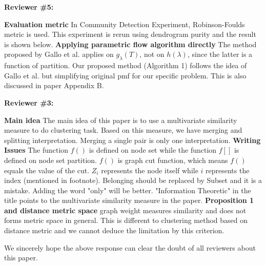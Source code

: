 \documentclass{article}
\begin{document}
\textbf{Reviewer \#5:}

\textbf{Evaluation metric} In Community Detection Experiment, Robinson-Foulds metric is used. This experiment is rerun using dendrogram purity and the result is shown below.
\textbf{Applying parametric flow algorithm directly} The method proposed by Gallo et al. applies on $g_{\lambda}(T)$, not on $h(\lambda)$, since the latter is a function of partition. Our proposed method (Algorithm 1) follows the idea of Gallo et al. but simplifying original \textsf{pmf} for our specific problem.
This is also discussed in paper Appendix B.

\textbf{Reviewer \#3:}

\textbf{Main idea} The main idea of this paper is to use a multivariate similarity measure to do clustering task. Based on this measure, we have merging and splitting interpretation.  Merging a single pair is only one interpretation.
\textbf{Writing Issues} The function $f()$ is defined on node set while the function $f[]$ is defined on node set partition. $f()$ is graph cut function, which means $f()$ equals the value of the cut. $Z_i$ represents the node itself while $i$ represents the index (mentioned in footnote). Belonging should be replaced by Subset and it is a mistake. Adding the word "only" will be better.
"Information Theoretic" in the title points to the multivariate similarity measure in the paper.
\textbf{Proposition 1 and distance metric space} graph weight measures similarity and does not forms metric space in general. This is different to clustering method based on distance metric and we cannot deduce the limitation by this criterion.

We sincerely hope the above response can clear the doubt of all reviewers about this paper.
\end{document}
